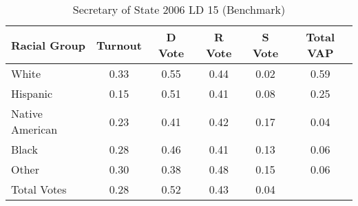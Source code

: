 \begin{table}[htb]
\begin{center}
\caption{Secretary of State 2006 LD 15 (Benchmark)}
\label{sos06_vap_ld_15_benchmark}
\begin{tabular}{lccccc}
  \hline
Racial Group & Turnout & D Vote & R Vote & S Vote & Total VAP \\ 
  \hline
White & 0.33 & 0.55 & 0.44 & 0.02 & 0.59 \\ 
  Hispanic & 0.15 & 0.51 & 0.41 & 0.08 & 0.25 \\ 
  Native American & 0.23 & 0.41 & 0.42 & 0.17 & 0.04 \\ 
  Black & 0.28 & 0.46 & 0.41 & 0.13 & 0.06 \\ 
  Other & 0.30 & 0.38 & 0.48 & 0.15 & 0.06 \\ 
  Total Votes & 0.28 & 0.52 & 0.43 & 0.04 &  \\ 
   \hline
\end{tabular}
\end{center}
\end{table}
